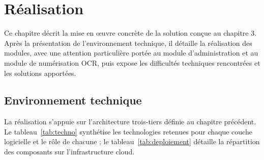 
\chapter{Réalisation}

Ce chapitre décrit la mise en œuvre concrète de la solution conçue au chapitre 3. Après la présentation de l'environnement technique, il détaille la réalisation des modules, avec une attention particulière portée au module d'administration et au module de numérisation OCR, puis expose les difficultés techniques rencontrées et les solutions apportées.

\section{Environnement technique}

La réalisation s'appuie sur l'architecture trois-tiers définie au chapitre précédent. Le tableau~\ref{tab:techno} synthétise les technologies retenues pour chaque couche logicielle et le rôle de chacune ; le tableau~\ref{tab:deploiement} détaille la répartition des composants sur l'infrastructure cloud.

